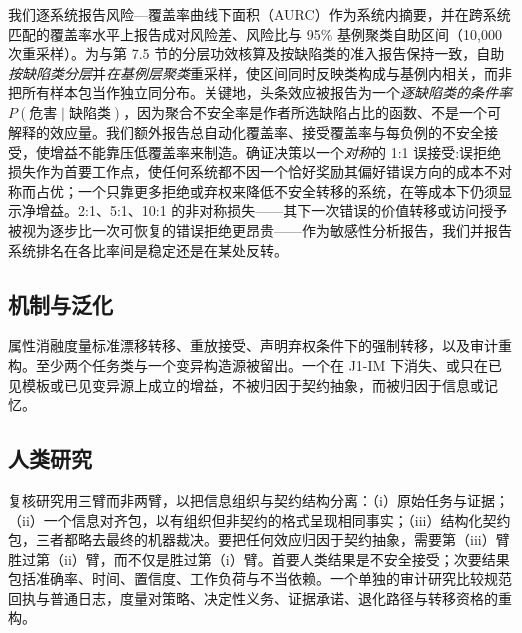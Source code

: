 \documentclass[11pt]{ctexart}
\begin{document}
我们逐系统报告风险—覆盖率曲线下面积（AURC）作为系统内摘要，并在跨系统匹配的覆盖率水平上报告成对风险差、风险比与 95\% 基例聚类自助区间（10{,}000 次重采样）\cite{efron1994bootstrap}。为与第 7.5 节的分层功效核算及按缺陷类的准入报告保持一致，自助\emph{按缺陷类分层}并\emph{在基例层聚类}重采样，使区间同时反映类构成与基例内相关，而非把所有样本包当作独立同分布。关键地，头条效应被报告为一个\emph{逐缺陷类的条件率} $P(\text{危害}\mid\text{缺陷类})$，因为聚合不安全率是作者所选缺陷占比的函数、不是一个可解释的效应量。我们额外报告总自动化覆盖率、接受覆盖率与每负例的不安全接受，使增益不能靠压低覆盖率来制造。确证决策以一个\emph{对称}的 1:1 误接受:误拒绝损失作为首要工作点，使任何系统都不因一个恰好奖励其偏好错误方向的成本不对称而占优；一个只靠更多拒绝或弃权来降低不安全转移的系统，在等成本下仍须显示净增益。2:1、5:1、10:1 的非对称损失——其下一次错误的价值转移或访问授予被视为逐步比一次可恢复的错误拒绝更昂贵——作为敏感性分析报告，我们并报告系统排名在各比率间是稳定还是在某处反转。

\subsection{机制与泛化}
属性消融度量标准漂移转移、重放接受、声明弃权条件下的强制转移，以及审计重构。至少两个任务类与一个变异构造源被留出。一个在 J1-IM 下消失、或只在已见模板或已见变异源上成立的增益，不被归因于契约抽象，而被归因于信息或记忆。

\subsection{人类研究}
复核研究用三臂而非两臂，以把信息组织与契约结构分离：（i）原始任务与证据；（ii）一个信息对齐包，以有组织但非契约的格式呈现相同事实；（iii）结构化契约包，三者都略去最终的机器裁决。要把任何效应归因于契约抽象，需要第（iii）臂胜过第（ii）臂，而不仅是胜过第（i）臂。首要人类结果是不安全接受；次要结果包括准确率、时间、置信度、工作负荷与不当依赖。一个单独的审计研究比较规范回执与普通日志，度量对策略、决定性义务、证据承诺、退化路径与转移资格的重构。
\end{document}
